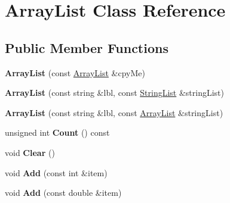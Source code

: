 \hypertarget{classrrc_1_1_array_list}{\section{Array\+List Class Reference}
\label{classrrc_1_1_array_list}
}
\subsection*{Public Member Functions}
\begin{DoxyCompactItemize}
\item 
\hypertarget{classrrc_1_1_array_list_acbb05e3198514df15229385925cf40a3}{{\bfseries Array\+List} (const \hyperlink{classrrc_1_1_array_list}{Array\+List} \&cpy\+Me)}\label{classrrc_1_1_array_list_acbb05e3198514df15229385925cf40a3}

\item 
\hypertarget{classrrc_1_1_array_list_a028aea1c545af53946615c4d5ddba7ca}{{\bfseries Array\+List} (const string \&lbl, const \hyperlink{classrrc_1_1_string_list}{String\+List} \&string\+List)}\label{classrrc_1_1_array_list_a028aea1c545af53946615c4d5ddba7ca}

\item 
\hypertarget{classrrc_1_1_array_list_a9c595e9d42b6a4d4e62404c11ef52839}{{\bfseries Array\+List} (const string \&lbl, const \hyperlink{classrrc_1_1_array_list}{Array\+List} \&string\+List)}\label{classrrc_1_1_array_list_a9c595e9d42b6a4d4e62404c11ef52839}

\item 
\hypertarget{classrrc_1_1_array_list_a074f9905a87bb9395d21d9f4bc8c459f}{unsigned int {\bfseries Count} () const }\label{classrrc_1_1_array_list_a074f9905a87bb9395d21d9f4bc8c459f}

\item 
\hypertarget{classrrc_1_1_array_list_aa71d36872f416feaa853788a7a7a7ef8}{void {\bfseries Clear} ()}\label{classrrc_1_1_array_list_aa71d36872f416feaa853788a7a7a7ef8}

\item 
\hypertarget{classrrc_1_1_array_list_a17caac96dcd8cceab22322f020519706}{void {\bfseries Add} (const int \&item)}\label{classrrc_1_1_array_list_a17caac96dcd8cceab22322f020519706}

\item 
\hypertarget{classrrc_1_1_array_list_a5c371a159c312404e83375094cd64e89}{void {\bfseries Add} (const double \&item)}\label{classrrc_1_1_array_list_a5c371a159c312404e83375094cd64e89}


\end{DoxyCompactItemize}
